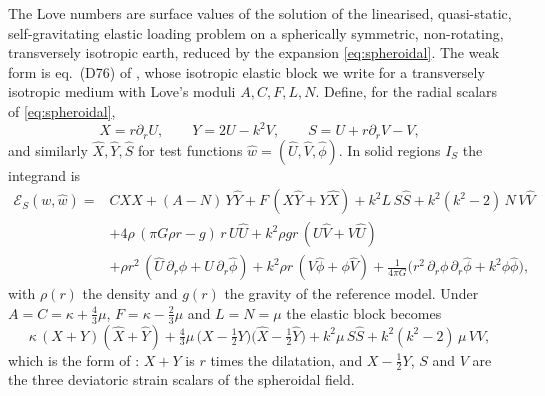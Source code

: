 \documentclass[11pt,a4paper]{article}
\numberwithin{equation}{section}
\begin{document}
The Love numbers are surface values of the solution of the linearised,
quasi-static, self-gravitating elastic loading problem on a spherically
symmetric, non-rotating, transversely isotropic earth, reduced by the expansion
\eqref{eq:spheroidal}. The weak form is eq.~(D76) of
\citet{AlAttarTromp2014}, whose isotropic elastic block we write for a
transversely isotropic medium with Love's moduli $A,C,F,L,N$. Define, for the
radial scalars of \eqref{eq:spheroidal},
\begin{equation}
X = r\partial_{r}U,\qquad
Y = 2U - k^{2}V,\qquad
S = U + r\partial_{r}V - V,
\label{eq:XYS}
\end{equation}
and similarly $\hat X,\hat Y,\hat S$ for test functions
$\hat w = (\hat U,\hat V,\hat\phi)$. In solid regions $I_{S}$ the integrand is
\begin{equation}
\begin{aligned}
\mathcal{E}_{S}(w,\hat w) ={}& C X\hat X + (A-N)\,Y\hat Y + F\,(X\hat Y+Y\hat X)
 + k^{2}L\,S\hat S + k^{2}(k^{2}-2)\,N\,V\hat V\\
&+ 4\rho\,(\pi G\rho r - g)\,r\,U\hat U
 + k^{2}\rho g r\,(U\hat V + V\hat U)\\
&+ \rho r^{2}\,(\hat U\,\partial_{r}\phi + U\,\partial_{r}\hat\phi)
 + k^{2}\rho r\,(V\hat\phi + \phi\hat V)
 + \frac{1}{4\pi G}\big(r^{2}\,\partial_{r}\phi\,\partial_{r}\hat\phi + k^{2}\phi\hat\phi\big),
\end{aligned}
\label{eq:solidform}
\end{equation}
with $\rho(r)$ the density and $g(r)$ the gravity of the reference model. Under
$A=C=\kappa+\tfrac43\mu$, $F=\kappa-\tfrac23\mu$ and $L=N=\mu$ the elastic
block becomes
\begin{equation}
\kappa\,(X+Y)(\hat X+\hat Y)
+ \tfrac43\mu\,\big(X-\tfrac12 Y\big)\big(\hat X-\tfrac12\hat Y\big)
+ k^{2}\mu\,S\hat S + k^{2}(k^{2}-2)\,\mu\,V\hat V,
\label{eq:isotropic}
\end{equation}
which is the form of \citet{AlAttarTromp2014}: $X+Y$ is $r$ times the
dilatation, and $X-\tfrac12Y$, $S$ and $V$ are the three deviatoric
strain scalars of the spheroidal field.
\end{document}
